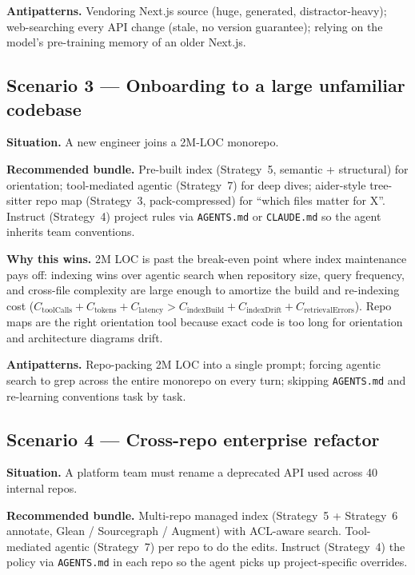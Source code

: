 \documentclass[
  11pt,
  letterpaper,
  numbers=noendperiod,
  parskip=half]{scrartcl}
\begin{document}
\figureVercelEval

\textbf{Antipatterns.} Vendoring Next.js source (huge, generated,
distractor-heavy); web-searching every API change (stale, no version
guarantee); relying on the model's pre-training memory of an older
Next.js.

\subsection{Scenario 3 --- Onboarding to a large unfamiliar
codebase}\label{sec-fit-scenario-onboard}

\textbf{Situation.} A new engineer joins a 2M-LOC monorepo.

\textbf{Recommended bundle.} Pre-built index (Strategy~5, semantic +
structural) for orientation; tool-mediated agentic (Strategy~7) for
deep dives; aider-style tree-sitter repo map (Strategy~3,
pack-compressed) for ``which files matter for X''. Instruct
(Strategy~4) project rules via \texttt{AGENTS.md} or
\texttt{CLAUDE.md} so the agent inherits team conventions.

\textbf{Why this wins.} 2M LOC is past the break-even point where
index maintenance pays off: indexing wins over agentic search when
repository size, query frequency, and cross-file complexity are large
enough to amortize the build and re-indexing cost
($C_\mathrm{toolCalls} + C_\mathrm{tokens} + C_\mathrm{latency} >
C_\mathrm{indexBuild} + C_\mathrm{indexDrift} +
C_\mathrm{retrievalErrors}$). Repo maps are the right orientation tool
because exact code is too long for orientation and architecture
diagrams drift.

\textbf{Antipatterns.} Repo-packing 2M LOC into a single prompt;
forcing agentic search to grep across the entire monorepo on every
turn; skipping \texttt{AGENTS.md} and re-learning conventions task by
task.

\subsection{Scenario 4 --- Cross-repo enterprise
refactor}\label{sec-fit-scenario-multi}

\textbf{Situation.} A platform team must rename a deprecated API used
across 40 internal repos.

\textbf{Recommended bundle.} Multi-repo managed index (Strategy~5 +
Strategy~6 annotate, Glean / Sourcegraph / Augment) with ACL-aware
search. Tool-mediated agentic (Strategy~7) per repo to do the edits.
Instruct (Strategy~4) the policy via \texttt{AGENTS.md} in each repo
so the agent picks up project-specific overrides.
\end{document}
